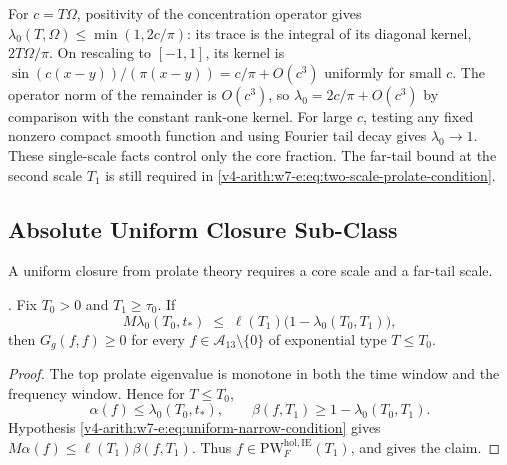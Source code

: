 \begin{remark}
\label{v4-arith:w7-e:rem:prolate-quantitative}
For $c=T\Omega$, positivity of the concentration operator gives
$\lambda_0(T,\Omega)\le\min(1,2c/\pi)$: its trace is the integral
of its diagonal kernel, $2T\Omega/\pi$.
On rescaling to $[-1,1]$, its kernel is
$\sin(c(x-y))/(\pi(x-y))=c/\pi+O(c^3)$ uniformly for small $c$.
The operator norm of the remainder is $O(c^3)$, so
$\lambda_0=2c/\pi+O(c^3)$ by comparison with the constant rank-one kernel.
For large $c$, testing any fixed nonzero compact smooth function
and using Fourier tail decay gives $\lambda_0\to1$.
These single-scale facts control only the core fraction.
The far-tail bound at the second scale $T_1$ is still required
in \eqref{v4-arith:w7-e:eq:two-scale-prolate-condition}.
\end{remark}

\subsection{Absolute Uniform Closure Sub-Class}
\label{v4-arith:w7-e:uniform-sub-class}

A uniform closure from prolate theory requires a core scale and a
far-tail scale.

\begin{corollary}
\label{v4-arith:w7-e:cor:uniform-narrow-PW}
\ClaimStatusProvedHere. Fix \(T_{0}>0\) and \(T_{1}\geq \tau_0\).
If
\begin{equation}
\label{v4-arith:w7-e:eq:uniform-narrow-condition}
M\lambda_{0}(T_{0},t_{\ast})\;\leq\;
\ell(T_{1})\bigl(1-\lambda_{0}(T_{0},T_{1})\bigr),
\end{equation}
then \(G_g(f,f)\geq0\) for every
\(f\in\mathscr A_{13}\setminus\{0\}\) of exponential type \(T\leq T_{0}\).
\end{corollary}

\begin{proof}
The top prolate eigenvalue is monotone in both the time window and the
frequency window. Hence for \(T\leq T_{0}\),
\[
\alpha(f)\leq\lambda_{0}(T_{0},t_{\ast}),\qquad
\beta(f,T_{1})\geq1-\lambda_{0}(T_{0},T_{1}).
\]
Hypothesis \eqref{v4-arith:w7-e:eq:uniform-narrow-condition} gives
\(M\alpha(f)\leq \ell(T_{1})\beta(f,T_{1})\). Thus
\(f\in\mathrm{PW}^{\mathrm{hol},\mathrm{IE}}_{F}(T_{1})\), and
 gives the claim.
\end{proof}


